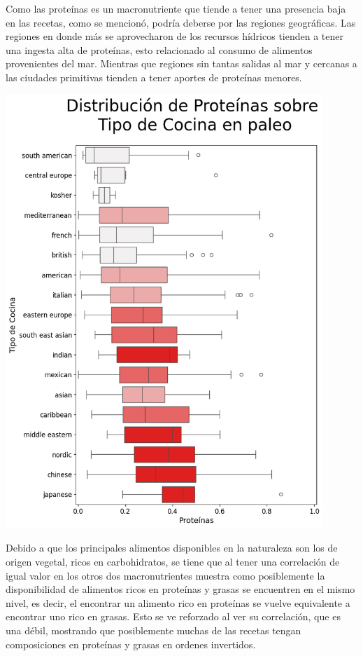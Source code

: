 \documentclass[12pt,a4paper]{article}
\begin{document}
            Como las proteínas es un macronutriente que tiende a tener una presencia 
            baja en las recetas, como se mencionó, podría deberse por las regiones geográficas. 
            Las regiones en donde más se aprovecharon de los recursos hídricos tienden a tener 
            una ingesta alta de proteínas, esto relacionado al consumo de alimentos provenientes 
            del mar. Mientras que regiones sin tantas salidas al mar y cercanas a las ciudades 
            primitivas tienden a tener aportes de proteínas	menores.

            \begin{center}
                \includegraphics[width=0.90\textwidth]{Resources/2_03_plot_04_2.png}
            \end{center}

            Debido a que los principales alimentos disponibles en la naturaleza son los de 
            origen vegetal, ricos en carbohidratos, se tiene que al tener una correlación de 
            igual valor en los otros dos macronutrientes muestra como posiblemente la disponibilidad 
            de alimentos ricos en proteínas y grasas se encuentren en el mismo nivel, es decir, 
            el encontrar un alimento rico en proteínas se vuelve equivalente a encontrar uno rico 
            en grasas. Esto se ve reforzado al ver su correlación, que es una débil, mostrando que 
            posiblemente muchas de las recetas tengan composiciones en proteínas y grasas en ordenes 
            invertidos.
\end{document}
